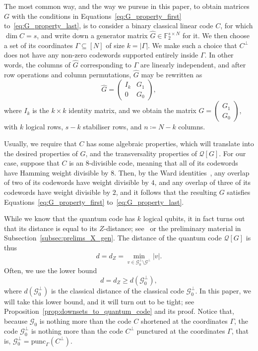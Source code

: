 \documentclass{article}
\begin{document}
The most common way, and the way we pursue in this paper, to obtain matrices $G$ with the conditions in Equations~\eqref{eq:G_property_first} to~\eqref{eq:G_property_last}, is to consider a binary classical linear code $C$, for which $\dim C = s$, and write down a generator matrix $\hat{G} \in \mathbb{F}_2^{s \times N}$ for it.  We then choose a set of its coordinates $\Gamma \subseteq [N]$ of size $k = |\Gamma|$. We make such a choice that $C^\perp$ does not have any non-zero codewords supported entirely inside $\Gamma$. In other words, the columns of $\hat{G}$ corresponding to $\Gamma$ are linearly independent, and after row operations and column permutations, $\hat{G}$ may be rewritten as
\begin{equation}\label{eq:semi_systematic_form_overview}
    \hat{G} = \begin{pmatrix}
        I_k & G_1\\
        0 & G_0
    \end{pmatrix},
\end{equation}
where $I_k$ is the $k \times k$ identity matrix, and we obtain the matrix $G = \left(\begin{smallmatrix}G_1\\G_0\end{smallmatrix}\right)$, with $k$ logical rows, $s-k$ stabiliser rows, and $n \coloneq N-k$ columns.

Usually, we require that $C$ has some algebraic properties, which will translate into the desired properties of $G$, and the transversality properties of $\mathcal{Q}[G]$. For our case, suppose that $C$ is an $8$-divisible code, meaning that all of its codewords have Hamming weight divisible by $8$. Then, by the Ward identities~\cite{ward1990weight}, any overlap of two of its codewords have weight divisible by $4$, and any overlap of three of its codewords have weight divisible by $2$, and it follows that the resulting $G$ satisfies Equations~\eqref{eq:G_property_first} to~\eqref{eq:G_property_last}.

While we know that the quantum code has $k$ logical qubits, it in fact turns out that its distance is equal to its $Z$-distance; see~\cite{bravyi2012magic} or the preliminary material in Subsection~\ref{subsec:prelims_X_gen}. The distance of the quantum code $\mathcal{Q}[G]$ is thus
\begin{equation}
    d = d_Z = \min_{v \in \mathcal{G}_0^\perp \setminus \mathcal{G}^\perp}|v|.
\end{equation}
Often, we use the lower bound
\begin{equation}\label{eq:lower_bound_degen}
    d = d_Z \geq d\left(\mathcal{G}_0^\perp\right),
\end{equation}
where $d\left(\mathcal{G}_0^\perp\right)$ is the classical distance of the classical code $\mathcal{G}_0^\perp$. In this paper, we will take this lower bound, and it will turn out to be tight; see Proposition~\ref{prop:downsets_to_quantum_code} and its proof. Notice that, because $\mathcal{G}_0$ is nothing more than the code $C$ shortened at the coordinates $\Gamma$, the code $\mathcal{G}_0^\perp$ is nothing more than the code $C^\perp$ punctured at the coordinates $\Gamma$, that is, $\mathcal{G}_0^\perp = \text{punc}_\Gamma(C^\perp)$.
\end{document}
